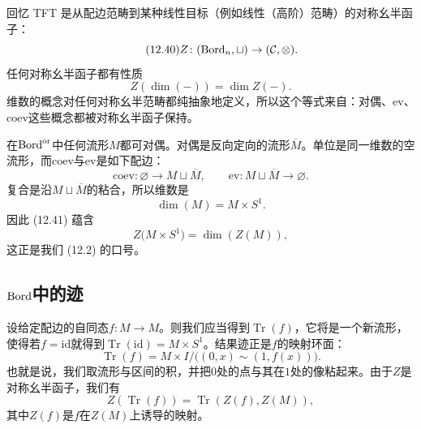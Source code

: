 回忆 TFT 是从配边范畴到某种线性目标（例如线性（高阶）范畴）的对称幺半函子：
\begin{equation}\tag{12.40}
Z\colon(\mathrm{Bord}_n,\sqcup)\to(\mathcal{C},\otimes).
\end{equation}
任何对称幺半函子都有性质
\begin{equation}\tag{12.41}
Z(\dim(-))=\dim Z(-).
\end{equation}
维数的概念对任何对称幺半范畴都纯抽象地定义，所以这个等式来自：对偶、$\mathrm{ev}$、$\mathrm{coev}$这些概念都被对称幺半函子保持。

在$\mathrm{Bord}^{\mathrm{or}}$中任何流形$M$都可对偶。对偶是反向定向的流形$\overline{M}$。单位是同一维数的空流形，而$\mathrm{coev}$与$\mathrm{ev}$是如下配边：
\begin{equation}\tag{12.42}
\mathrm{coev}\colon\varnothing\to M\sqcup\overline{M},\qquad \mathrm{ev}\colon M\sqcup\overline{M}\to\varnothing.
\end{equation}
复合是沿$M\sqcup\overline{M}$的粘合，所以维数是
\begin{equation}\tag{12.43}
\dim(M)=M\times S^{1}.
\end{equation}
因此 (12.41) 蕴含
\begin{equation}\tag{12.44}
Z\bigl(M\times S^{1}\bigr)=\dim(Z(M)),
\end{equation}
这正是我们 (12.2) 的口号。

\subsection{$\mathrm{Bord}$中的迹}\label{sec:12-5-1}

设给定配边的自同态$f\colon M\to M$。则我们应当得到$\operatorname{Tr}(f)$，它将是一个新流形，使得若$f=\mathrm{id}$就得到$\operatorname{Tr}(\mathrm{id})=M\times S^{1}$。结果迹正是$f$的映射环面：
\begin{equation}\tag{12.45}
\operatorname{Tr}(f)=M\times I\big/\bigl((0,x)\sim(1,f(x))\bigr).
\end{equation}
也就是说，我们取流形与区间的积，并把$0$处的点与其在$1$处的像粘起来。由于$Z$是对称幺半函子，我们有
\begin{equation}\tag{12.46}
Z(\operatorname{Tr}(f))=\operatorname{Tr}(Z(f),Z(M)),
\end{equation}
其中$Z(f)$是$f$在$Z(M)$上诱导的映射。



